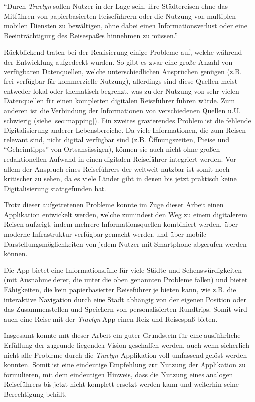 	\vspace{0.25cm}
	
	\enquote{Durch \textit{Travlyn} sollen Nutzer in der Lage sein, ihre Städtereisen ohne das Mitführen von papierbasierten Reiseführern oder die Nutzung von multiplen mobilen Diensten zu bewältigen, ohne dabei einen Informationsverlust oder eine Beeinträchtigung des Reisespaßes hinnehmen zu müssen.}
	
	\vspace{0.25cm}   
	
	Rückblickend traten bei der Realisierung einige Probleme auf, welche während der Entwicklung aufgedeckt wurden. So gibt es zwar eine große Anzahl von verfügbaren Datenquellen, welche unterschiedlichen Ansprüchen genügen (z.B. frei verfügbar für kommerzielle Nutzung), allerdings sind diese Quellen meist entweder lokal oder thematisch begrenzt, was zu der Nutzung von sehr vielen Datenquellen für einen kompletten digitalen Reiseführer führen würde. Zum anderen ist die Verbindung der Informationen von verschiedenen Quellen u.U. schwierig (siehe \autoref{sec:mapping}).
	Ein zweites gravierendes Problem ist die fehlende Digitalisierung anderer Lebensbereiche. Da viele Informationen, die zum Reisen relevant sind, nicht digital verfügbar sind (z.B. Öffnungszeiten, Preise und \enquote{Geheimtipps} von Ortsansässigen), können sie auch nicht ohne großen redaktionellen Aufwand in einen digitalen Reiseführer integriert werden. Vor allem der Anspruch eines Reiseführers der weltweit nutzbar ist somit noch kritischer zu sehen, da es viele Länder gibt in denen bis jetzt praktisch keine Digitalisierung stattgefunden hat.
	
	\vspace{0.25cm}
	
	Trotz dieser aufgetretenen Probleme konnte im Zuge dieser Arbeit einen Applikation entwickelt werden, welche zumindest den Weg zu einem digitalerem Reisen aufzeigt, indem mehrere Informationsquellen kombiniert werden, über moderne Infrastruktur verfügbar gemacht werden und über mobile Darstellungsmöglichkeiten von jedem Nutzer mit Smartphone abgerufen werden können.
	
	Die App bietet eine Informationsfülle für viele Städte und Sehenswürdigkeiten (mit Ausnahme derer, die unter die oben genannten Probleme fallen) und bietet Fähigkeiten, die kein papierbasierter Reiseführer je bieten kann, wie z.B. die interaktive Navigation durch eine Stadt abhängig von der eigenen Position oder das Zusammenstellen und Speichern von personalisierten Rundtrips. Somit wird auch eine Reise mit der \textit{Travlyn} App einen Reiz und Reisespaß bieten.
	
	\vspace{0.25cm}
	
	Insgesamt konnte mit dieser Arbeit ein guter Grundstein für eine ausführliche Erfüllung der zugrunde liegenden Vision geschaffen werden, auch wenn sicherlich nicht alle Probleme durch die \textit{Travlyn} Applikation voll umfassend gelöst werden konnten. Somit ist eine eindeutige Empfehlung zur Nutzung der Applikation zu formulieren,  mit dem eindeutigen Hinweis, dass die Nutzung eines analogen Reiseführers bis jetzt nicht komplett ersetzt werden kann und weiterhin seine Berechtigung behält.